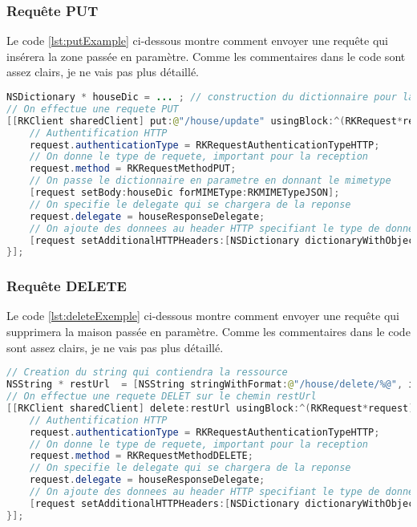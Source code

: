\subsubsection{Requête PUT}
Le code \ref{lst:putExample} ci-dessous montre comment envoyer une requête qui insérera la zone passée en paramètre. Comme les commentaires dans le code sont assez clairs, je ne vais pas plus détaillé.
\begin{lstlisting}[language={JAVA}, caption={Exemple de requête PUT}, label={lst:putExample}]
NSDictionary * houseDic = ... ; // construction du dictionnaire pour la requete
// On effectue une requete PUT
[[RKClient sharedClient] put:@"/house/update" usingBlock:^(RKRequest*request){
	// Authentification HTTP
	request.authenticationType = RKRequestAuthenticationTypeHTTP;
	// On donne le type de requete, important pour la reception
	request.method = RKRequestMethodPUT;
	// On passe le dictionnaire en parametre en donnant le mimetype
	[request setBody:houseDic forMIMEType:RKMIMETypeJSON];
	// On specifie le delegate qui se chargera de la reponse
	request.delegate = houseResponseDelegate;
	// On ajoute des donnees au header HTTP specifiant le type de donnees
	[request setAdditionalHTTPHeaders:[NSDictionary dictionaryWithObjectsAndKeys:JSON_APP, CONTEXT_TYPE, nil]];
}];
\end{lstlisting}
\subsubsection{Requête DELETE}
Le code \ref{lst:deleteExemple} ci-dessous montre comment envoyer une requête qui supprimera la maison passée en paramètre. Comme les commentaires dans le code sont assez clairs, je ne vais pas plus détaillé.
\begin{lstlisting}[language={JAVA}, caption={Exemple de requête DELETE}, label={lst:deleteExemple}]
// Creation du string qui contiendra la ressource
NSString * restUrl  = [NSString stringWithFormat:@"/house/delete/%@", idToDelete];
// On effectue une requete DELET sur le chemin restUrl   
[[RKClient sharedClient] delete:restUrl usingBlock:^(RKRequest*request){
	// Authentification HTTP
	request.authenticationType = RKRequestAuthenticationTypeHTTP;
	// On donne le type de requete, important pour la reception
	request.method = RKRequestMethodDELETE;
	// On specifie le delegate qui se chargera de la reponse
	request.delegate = houseResponseDelegate;
	// On ajoute des donnees au header HTTP specifiant le type de donnees
	[request setAdditionalHTTPHeaders:[NSDictionary dictionaryWithObjectsAndKeys:JSON_APP, CONTEXT_TYPE, nil]];
}];
\end{lstlisting}

